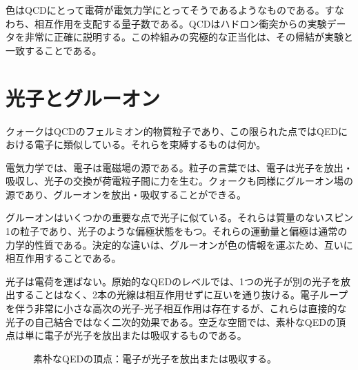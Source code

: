 
\begin{classroomqa}
\end{classroomqa}

色はQCDにとって電荷が電気力学にとってそうであるようなものである。すなわち、相互作用を支配する量子数である。QCDはハドロン衝突からの実験データを非常に正確に説明する。この枠組みの究極的な正当化は、その帰結が実験と一致することである。

\section{光子とグルーオン}

クォークはQCDのフェルミオン的物質粒子であり、この限られた点ではQEDにおける電子に類似している。それらを束縛するものは何か。

電気力学では、電子は電磁場の源である。粒子の言葉では、電子は光子を放出・吸収し、光子の交換が荷電粒子間に力を生む。クォークも同様にグルーオン場の源であり、グルーオンを放出・吸収することができる。

グルーオンはいくつかの重要な点で光子に似ている。それらは質量のないスピン1の粒子であり、光子のような偏極状態をもつ。それらの運動量と偏極は通常の力学的性質である。決定的な違いは、グルーオンが色の情報を運ぶため、互いに相互作用することである。

光子は電荷を運ばない。原始的なQEDのレベルでは、1つの光子が別の光子を放出することはなく、2本の光線は相互作用せずに互いを通り抜ける。電子ループを伴う非常に小さな高次の光子-光子相互作用は存在するが、これらは直接的な光子の自己結合ではなく二次的効果である。空乏な空間では、素朴なQEDの頂点は単に電子が光子を放出または吸収するものである。

\begin{figure}[h]
\centering
{}
\caption{素朴なQEDの頂点：電子が光子を放出または吸収する。}
\end{figure}

